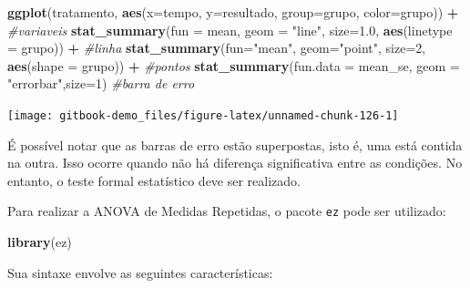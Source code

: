 \documentclass[
]{book}
\newenvironment{Shaded}{\begin{snugshade}}{\end{snugshade}}
\newcommand{\CommentTok}[1]{\textcolor[rgb]{0.56,0.35,0.01}{\textit{#1}}}
\newcommand{\DataTypeTok}[1]{\textcolor[rgb]{0.13,0.29,0.53}{#1}}
\newcommand{\DecValTok}[1]{\textcolor[rgb]{0.00,0.00,0.81}{#1}}
\newcommand{\FloatTok}[1]{\textcolor[rgb]{0.00,0.00,0.81}{#1}}
\newcommand{\KeywordTok}[1]{\textcolor[rgb]{0.13,0.29,0.53}{\textbf{#1}}}
\newcommand{\NormalTok}[1]{#1}
\newcommand{\OperatorTok}[1]{\textcolor[rgb]{0.81,0.36,0.00}{\textbf{#1}}}
\newcommand{\StringTok}[1]{\textcolor[rgb]{0.31,0.60,0.02}{#1}}
\begin{document}
\begin{Shaded}
\begin{Highlighting}[]
\KeywordTok{ggplot}\NormalTok{(tratamento, }\KeywordTok{aes}\NormalTok{(}\DataTypeTok{x=}\NormalTok{tempo, }\DataTypeTok{y=}\NormalTok{resultado, }
                       \DataTypeTok{group=}\NormalTok{grupo, }\DataTypeTok{color=}\NormalTok{grupo)) }\OperatorTok{+}\StringTok{ }\CommentTok{#variaveis}
\StringTok{  }\KeywordTok{stat_summary}\NormalTok{(}\DataTypeTok{fun =}\NormalTok{ mean, }\DataTypeTok{geom =} \StringTok{"line"}\NormalTok{, }
               \DataTypeTok{size=}\FloatTok{1.0}\NormalTok{, }\KeywordTok{aes}\NormalTok{(}\DataTypeTok{linetype =}\NormalTok{ grupo)) }\OperatorTok{+}\StringTok{ }\CommentTok{#linha}
\StringTok{  }\KeywordTok{stat_summary}\NormalTok{(}\DataTypeTok{fun=}\StringTok{"mean"}\NormalTok{, }\DataTypeTok{geom=}\StringTok{"point"}\NormalTok{, }
               \DataTypeTok{size=}\DecValTok{2}\NormalTok{, }\KeywordTok{aes}\NormalTok{(}\DataTypeTok{shape =}\NormalTok{ grupo)) }\OperatorTok{+}\StringTok{ }\CommentTok{#pontos}
\StringTok{  }\KeywordTok{stat_summary}\NormalTok{(}\DataTypeTok{fun.data =}\NormalTok{ mean_se, }
               \DataTypeTok{geom =} \StringTok{"errorbar"}\NormalTok{,}\DataTypeTok{size=}\DecValTok{1}\NormalTok{) }\CommentTok{#barra de erro}
\end{Highlighting}
\end{Shaded}

\begin{center}\texttt{[image: gitbook-demo\_files/figure-latex/unnamed-chunk-126-1]} \end{center}

É possível notar que as barras de erro estão superpostas, isto é, uma está contida na outra. Isso ocorre quando não há diferença significativa entre as condições. No entanto, o teste formal estatístico deve ser realizado.

Para realizar a ANOVA de Medidas Repetidas, o pacote \texttt{ez} pode ser utilizado:

\begin{Shaded}
\begin{Highlighting}[]
\KeywordTok{library}\NormalTok{(ez)}
\end{Highlighting}
\end{Shaded}

Sua sintaxe envolve as seguintes características:
\end{document}
